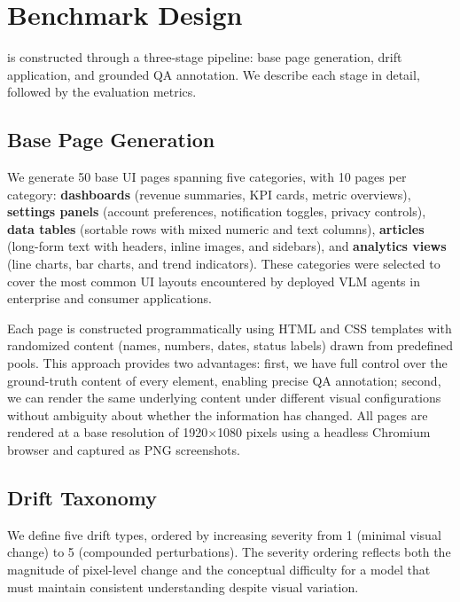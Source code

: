 \section{Benchmark Design}
\label{sec:method}

\bench{} is constructed through a three-stage pipeline: base page generation, drift application, and grounded QA annotation. We describe each stage in detail, followed by the evaluation metrics.

\subsection{Base Page Generation}
\label{sec:method:pages}

We generate 50 base UI pages spanning five categories, with 10 pages per category: \textbf{dashboards} (revenue summaries, KPI cards, metric overviews), \textbf{settings panels} (account preferences, notification toggles, privacy controls), \textbf{data tables} (sortable rows with mixed numeric and text columns), \textbf{articles} (long-form text with headers, inline images, and sidebars), and \textbf{analytics views} (line charts, bar charts, and trend indicators). These categories were selected to cover the most common UI layouts encountered by deployed VLM agents in enterprise and consumer applications.

Each page is constructed programmatically using HTML and CSS templates with randomized content (names, numbers, dates, status labels) drawn from predefined pools. This approach provides two advantages: first, we have full control over the ground-truth content of every element, enabling precise QA annotation; second, we can render the same underlying content under different visual configurations without ambiguity about whether the information has changed. All pages are rendered at a base resolution of 1920$\times$1080 pixels using a headless Chromium browser and captured as PNG screenshots.

\subsection{Drift Taxonomy}
\label{sec:method:drift}

We define five drift types, ordered by increasing severity from 1 (minimal visual change) to 5 (compounded perturbations). The severity ordering reflects both the magnitude of pixel-level change and the conceptual difficulty for a model that must maintain consistent understanding despite visual variation.

